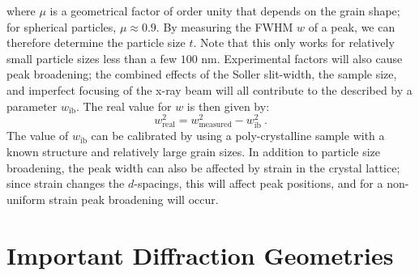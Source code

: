 where $\mu$ is a geometrical factor of order unity that depends on the grain shape; for spherical particles, $\mu\approx 0.9$.  By measuring the FWHM $w$ of a peak, we can therefore determine the particle size $t$.  Note that this only works for relatively small particle sizes less than a few $100$ nm.  Experimental factors will also cause peak broadening; the combined effects of the Soller slit-width, the sample size, and imperfect focusing of the x-ray beam will all contribute to the  described by a parameter $w_{\text{ib}}$.  The real value for $w$ is then given by:
\[
	w_{\text{real}}^2 = w_{\text{measured}}^2-w_{\text{ib}}^2\ .
\]
The value of $w_{\text{ib}}$ can be calibrated by using a poly-crystalline sample with a known structure and relatively large grain sizes. In addition to particle size broadening, the peak width can also be affected by strain in the crystal lattice; since strain changes the $d$-spacings, this will affect peak positions, and for a non-uniform strain peak  broadening will occur.


\section{Important Diffraction Geometries}\label{\chabbr:sec:DiffractionGeometries}

